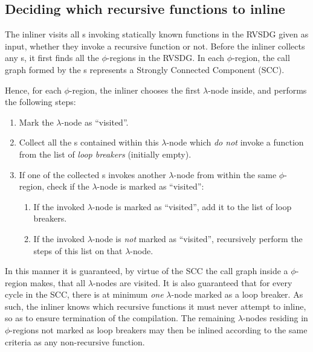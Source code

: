 \subsection{Deciding which recursive functions to inline}
\label{sub:scheme:inlining_recur_apply_nodes}

The inliner visits all \applyNode s invoking statically known functions in the
RVSDG given as input, whether they invoke a recursive function or not. Before
the inliner collects any \applyNode s, it first finds all the $\phi$-regions in
the RVSDG. In each $\phi$-region, the call graph formed by the \applyNode s
represents a Strongly Connected Component (SCC).

Hence, for each $\phi$-region, the inliner chooses the first $\lambda$-node
inside, and performs the following steps:

\begin{enumerate}
	\item Mark the $\lambda$-node as ``visited''.

	\item Collect all the \applyNode s contained within this $\lambda$-node
which \textit{do not} invoke a function from the list of \textit{loop breakers}
(initially empty).

	\item If one of the collected \applyNode s invokes another $\lambda$-node
from within the same $\phi$-region, check if the $\lambda$-node is marked as
``visited'':
	\begin{enumerate}
		\item If the invoked $\lambda$-node is marked as ``visited'', add it to
the list of loop breakers.

		\item If the invoked $\lambda$-node is \textit{not} marked as
``visited'', recursively perform the steps of this list on that $\lambda$-node.
	\end{enumerate}
\end{enumerate}

In this manner it is guaranteed, by virtue of the SCC the call graph inside a
$\phi$-region makes, that all $\lambda$-nodes are visited. It is also guaranteed
that for every cycle in the SCC, there is at minimum \textit{one} $\lambda$-node
marked as a loop breaker. As such, the inliner knows which recursive functions
it must never attempt to inline, so as to ensure termination of the compilation.
The remaining $\lambda$-nodes residing in $\phi$-regions not marked as loop
breakers may then be inlined according to the same criteria as any non-recursive
function.

